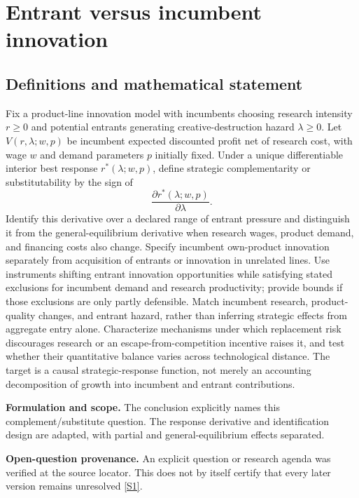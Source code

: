\documentclass[11pt]{article}
\newcommand{\sref}[2]{\hyperlink{source:#1:#2}{[S#2]}}
\begin{document}
\section*{Entrant versus incumbent innovation}\label{30007547}
\subsection{Definitions and mathematical statement}
Fix a product-line innovation model with incumbents choosing research intensity \(r\ge0\) and potential entrants generating creative-destruction hazard \(\lambda\ge0\). Let \(V(r,\lambda;w,p)\) be incumbent expected discounted profit net of research cost, with wage \(w\) and demand parameters \(p\) initially fixed. Under a unique differentiable interior best response \(r^*(\lambda;w,p)\), define strategic complementarity or substitutability by the sign of
\[
\frac{\partial r^*(\lambda;w,p)}{\partial\lambda}.
\]
Identify this derivative over a declared range of entrant pressure and distinguish it from the general-equilibrium derivative when research wages, product demand, and financing costs also change. Specify incumbent own-product innovation separately from acquisition of entrants or innovation in unrelated lines.
Use instruments shifting entrant innovation opportunities while satisfying stated exclusions for incumbent demand and research productivity; provide bounds if those exclusions are only partly defensible. Match incumbent research, product-quality changes, and entrant hazard, rather than inferring strategic effects from aggregate entry alone. Characterize mechanisms under which replacement risk discourages research or an escape-from-competition incentive raises it, and test whether their quantitative balance varies across technological distance. The target is a causal strategic-response function, not merely an accounting decomposition of growth into incumbent and entrant contributions.

\par\textbf{Formulation and scope.} The conclusion explicitly names this complement/substitute question. The response derivative and identification design are adapted, with partial and general-equilibrium effects separated.

\par\textbf{Open-question provenance.} An explicit question or research agenda was verified at the source locator. This does not by itself certify that every later version remains unresolved \sref{30007547}{1}.
\end{document}
